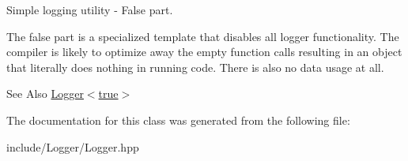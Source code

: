 Simple logging utility -\/ False part. 

The false part is a specialized template that disables all logger functionality. The compiler is likely to optimize away the empty function calls resulting in an object that literally does nothing in running code. There is also no data usage at all.

\begin{DoxySeeAlso}{See Also}
\hyperlink{classttl_1_1_logger_3_01true_01_4}{Logger$<$true$>$} 
\end{DoxySeeAlso}


The documentation for this class was generated from the following file\-:\begin{DoxyCompactItemize}
\item 
include/\-Logger/Logger.\-hpp\end{DoxyCompactItemize}
